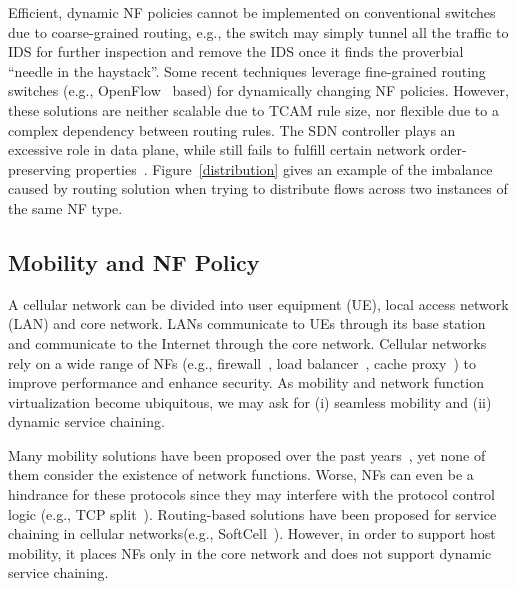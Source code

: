 Efficient, dynamic NF policies cannot be implemented on conventional switches due to coarse-grained routing, e.g., the switch may simply tunnel all the traffic to IDS for further inspection and remove the IDS once it finds the proverbial ``needle in the haystack''. Some recent techniques leverage fine-grained routing switches (e.g., OpenFlow~\cite{openflow} based) for dynamically changing NF policies. However, these solutions are neither scalable due to TCAM rule size, nor flexible due to a complex dependency between routing rules. The SDN controller plays an excessive role in data plane, while still fails to fulfill certain network order-preserving properties~\cite{splitmerge, OpenNF}. Figure~\ref{distribution} gives an example of the imbalance caused by routing solution when trying to distribute flows across two instances of the same NF type. 

\subsection{Mobility and NF Policy} 
A cellular network can be divided into user equipment (UE), local access network (LAN) and core network.  LANs communicate to UEs through its base station and communicate to the Internet through the core network. Cellular networks rely on a wide range of NFs (e.g., firewall~\cite{IPTABLES}, load balancer~\cite{balance}, cache proxy~\cite{squid}) to improve performance and enhance security. As mobility and network function virtualization become ubiquitous, we may ask for (i) seamless mobility and (ii) dynamic service chaining.

Many mobility solutions have been proposed over the past years~\cite{mip, TCPMobile, I3Mobile, serval}, yet none of them consider the existence of network functions. Worse, NFs can even be a hindrance for these protocols since they may interfere with the protocol control logic (e.g., TCP split~\cite{TCPProxy}). Routing-based solutions have been proposed for service chaining in cellular networks(e.g., SoftCell~\cite{softcell}). However, in order to support host mobility, it places NFs only in the core network and does not support dynamic service chaining. 


